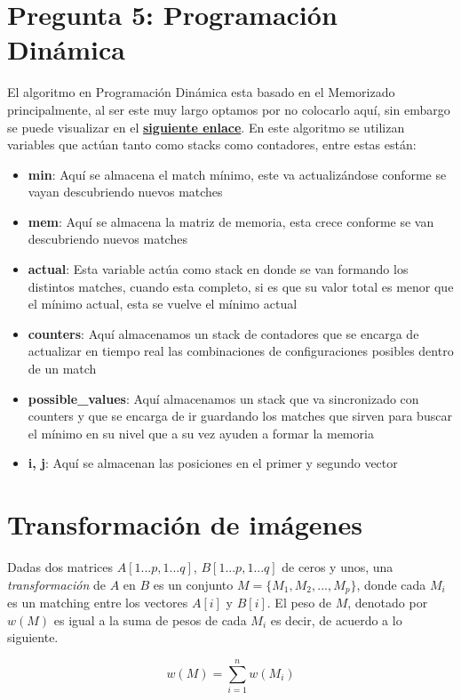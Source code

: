 \documentclass[conference]{IEEEtran}
\begin{document}
\section{Pregunta 5: Programación Dinámica}
El algoritmo en Programación Dinámica esta basado en el Memorizado principalmente, al ser este muy largo optamos por no colocarlo aquí, sin embargo se puede visualizar en el \href{https://github.com/Piero16301/Proyecto_ADA/blob/master/Source/functionsVectors/matchDP.py}{\textbf{siguiente enlace}}. En este algoritmo se utilizan variables que actúan tanto como stacks como contadores, entre estas están:
\begin{itemize}
    \item \textbf{min}: Aquí se almacena el match mínimo, este va actualizándose conforme se vayan descubriendo nuevos matches
    \item \textbf{mem}: Aquí se almacena la matriz de memoria, esta crece conforme se van descubriendo nuevos matches
    \item \textbf{actual}: Esta variable actúa como stack en donde se van formando los distintos matches, cuando esta completo, si es que su valor total es menor que el mínimo actual, esta se vuelve el mínimo actual
    \item \textbf{counters}: Aquí almacenamos un stack de contadores que se encarga de actualizar en tiempo real las combinaciones de configuraciones posibles dentro de un match
    \item \textbf{possible\_values}: Aquí almacenamos un stack que va sincronizado con counters y que se encarga de ir guardando los matches que sirven para buscar el mínimo en su nivel que a su vez ayuden a formar la memoria
    \item \textbf{i, j}: Aquí se almacenan las posiciones en el primer y segundo vector
\end{itemize}%

\section{Transformación de imágenes}
Dadas dos matrices $A[1...p, 1...q]$, $B[1...p,1...q]$ de ceros y unos, una \textit{transformación} de $A$ en $B$ es un conjunto $M=\{M_1,M_2,...,M_p\}$, donde cada $M_i$ es un matching entre los vectores $A[i]$ y $B[i]$. El peso de $M$, denotado por $w(M)$ es igual a la suma de pesos de cada $M_i$ es decir, de acuerdo a lo siguiente.

$$w(M)=\sum _{i=1}^nw\left(M_i\right)$$
\end{document}
